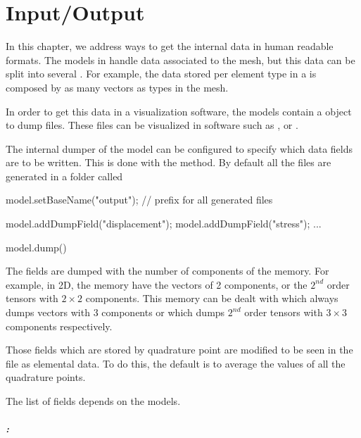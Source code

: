 
\chapter{Input/Output}

In this chapter, we address ways to get the internal data in human readable formats.
The models in \akantu handle data associated to the
mesh, but this data can be split into several . For example, the
data stored per element type in a  is composed by as
many vectors as types in the mesh.

In order to get this data in a visualization software, the models contain a
object to dump  files. These files can be visualized in software such
as \cite{paraview}, \cite{visit} or \cite{mayavi}.

The internal dumper of the model can be configured to specify which data fields
are to be written. This is done with the
 method. By default all the files
are generated in a folder called 

\begin{cpp}
  model.setBaseName("output"); // prefix for all generated files

  model.addDumpField("displacement");
  model.addDumpField("stress");
  ...

  model.dump()
\end{cpp}

The fields are dumped with the number of components of the memory. For example, in 2D, the memory have 
the vectors of 2 components, or the $2^{nd}$ order tensors with $2\times2$ components.  
This memory can be dealt with  which always dumps
vectors with 3 components or  which dumps $2^{nd}$
order tensors with $3\times3$ components respectively.

Those fields which are stored by quadrature point are modified to be seen in the
 file as elemental data. To do this, the default is to average the
values of all the quadrature points.

The list of fields depends on the models.

\paragraph{:}\hfill
\vspace*{0.2cm}

